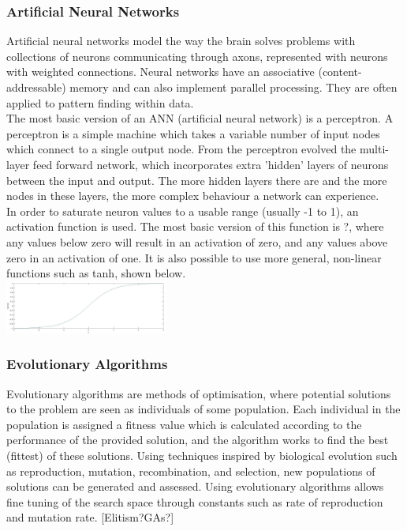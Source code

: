 \documentclass[11pt,a4paper]{article}
\begin{document}
\subsubsection{Artificial Neural Networks}
Artificial neural networks model the way the brain solves problems with collections of neurons communicating through axons, represented with neurons with weighted connections. Neural networks have an associative (content-addressable) memory and can also implement parallel processing. They are often applied to pattern finding within data.\\

The most basic version of an ANN (artificial neural network) is a perceptron. A perceptron is a simple machine which takes a variable number of input nodes which connect to a single output node. From the perceptron evolved the multi-layer feed forward network, which incorporates extra 'hidden' layers of neurons between the input and output. The more hidden layers there are and the more nodes in these layers, the more complex behaviour a network can experience.\\

In order to saturate neuron values to a usable range (usually -1 to 1), an activation function is used. The most basic version of this function is ?, where any values below zero will result in an activation of zero, and any values above zero in an activation of one. It is also possible to use more general, non-linear functions such as tanh, shown below.\\
\includegraphics[width=0.4\textwidth, height=0.4\textwidth]{tanh}

\subsubsection{Evolutionary Algorithms}
Evolutionary algorithms are methods of optimisation, where potential solutions to the problem are seen as individuals of some population. Each individual in the population is assigned a fitness value which is calculated according to the performance of the provided solution, and the algorithm works to find the best (fittest) of these solutions. Using techniques inspired by biological evolution such as reproduction, mutation, recombination, and selection, new populations of solutions can be generated and assessed. Using evolutionary algorithms allows fine tuning of the search space through constants such as rate of reproduction and mutation rate. [Elitism?GAs?]
\end{document}
